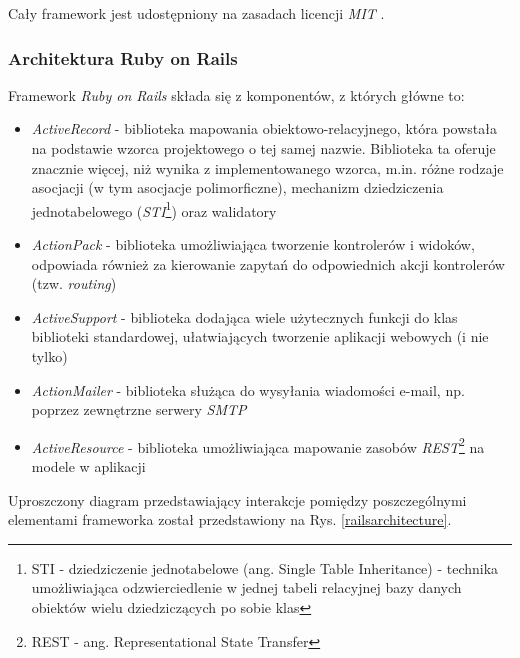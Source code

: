 \documentclass[a4paper,12pt]{article}
\providecommand{\imref}[1]{Rys. \ref{#1}} %
\begin{document}
Cały framework jest udostępniony na zasadach licencji \emph{MIT}
\cite{mit}.

\subsubsection{Architektura Ruby on Rails}
Framework \emph{Ruby on Rails} składa się z komponentów, z których
główne to:

\begin{itemize}
\item \emph{ActiveRecord} - biblioteka mapowania
  obiektowo-relacyjnego, która powstała na podstawie wzorca
  projektowego o tej samej nazwie\cite{activerecord}. Biblioteka ta
  oferuje znacznie więcej, niż wynika z implementowanego wzorca,
  m.in. różne rodzaje asocjacji (w tym asocjacje
  polimorficzne\cite{polymorphic}), mechanizm dziedziczenia
  jednotabelowego (\emph{STI}\footnote{STI - dziedziczenie
    jednotabelowe (ang. Single Table Inheritance) - technika
    umożliwiająca odzwierciedlenie w jednej tabeli relacyjnej bazy
    danych obiektów wielu dziedziczących po sobie klas\cite{sti}})
  oraz walidatory
\item \emph{ActionPack} - biblioteka umożliwiająca tworzenie
  kontrolerów i widoków, odpowiada również za kierowanie zapytań do
  odpowiednich akcji kontrolerów (tzw. \emph{routing})
\item \emph{ActiveSupport} - biblioteka dodająca wiele użytecznych
  funkcji do klas biblioteki standardowej, ułatwiających tworzenie
  aplikacji webowych (i nie tylko)
\item \emph{ActionMailer} - biblioteka służąca do wysyłania wiadomości
  e-mail, np. poprzez zewnętrzne serwery \emph{SMTP}
\item \emph{ActiveResource} - biblioteka umożliwiająca mapowanie
  zasobów \emph{REST}\footnote{REST - ang. Representational State
    Transfer} na modele w aplikacji
\end{itemize}

Uproszczony diagram przedstawiający interakcje pomiędzy poszczególnymi
elementami frameworka został przedstawiony na
\imref{railsarchitecture}.
\end{document}

